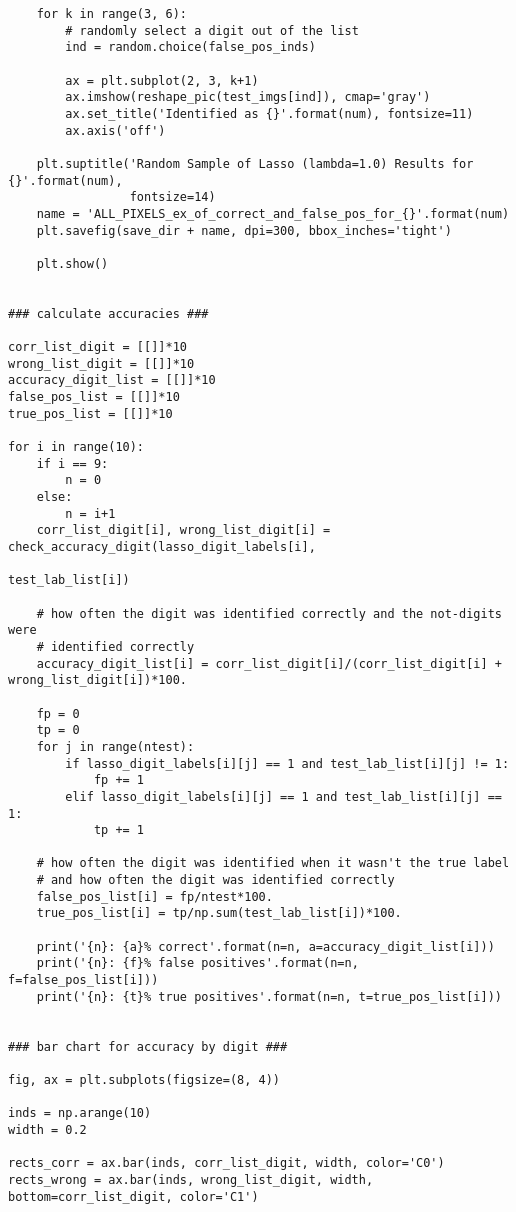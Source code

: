 \documentclass[10pt]{article}
\begin{document}
\begin{lstlisting}
    for k in range(3, 6):
        # randomly select a digit out of the list
        ind = random.choice(false_pos_inds)
        
        ax = plt.subplot(2, 3, k+1)
        ax.imshow(reshape_pic(test_imgs[ind]), cmap='gray')
        ax.set_title('Identified as {}'.format(num), fontsize=11)
        ax.axis('off')        
    
    plt.suptitle('Random Sample of Lasso (lambda=1.0) Results for {}'.format(num),
                 fontsize=14)
    name = 'ALL_PIXELS_ex_of_correct_and_false_pos_for_{}'.format(num)
    plt.savefig(save_dir + name, dpi=300, bbox_inches='tight')
    
    plt.show()


### calculate accuracies ###

corr_list_digit = [[]]*10
wrong_list_digit = [[]]*10
accuracy_digit_list = [[]]*10
false_pos_list = [[]]*10
true_pos_list = [[]]*10

for i in range(10):
    if i == 9:
        n = 0
    else:
        n = i+1
    corr_list_digit[i], wrong_list_digit[i] = check_accuracy_digit(lasso_digit_labels[i],
                                                                   test_lab_list[i])
    
    # how often the digit was identified correctly and the not-digits were
    # identified correctly
    accuracy_digit_list[i] = corr_list_digit[i]/(corr_list_digit[i] + wrong_list_digit[i])*100.
    
    fp = 0
    tp = 0
    for j in range(ntest):
        if lasso_digit_labels[i][j] == 1 and test_lab_list[i][j] != 1:
            fp += 1
        elif lasso_digit_labels[i][j] == 1 and test_lab_list[i][j] == 1:
            tp += 1
    
    # how often the digit was identified when it wasn't the true label
    # and how often the digit was identified correctly
    false_pos_list[i] = fp/ntest*100.
    true_pos_list[i] = tp/np.sum(test_lab_list[i])*100.
    
    print('{n}: {a}% correct'.format(n=n, a=accuracy_digit_list[i]))
    print('{n}: {f}% false positives'.format(n=n, f=false_pos_list[i]))
    print('{n}: {t}% true positives'.format(n=n, t=true_pos_list[i]))
    

### bar chart for accuracy by digit ###

fig, ax = plt.subplots(figsize=(8, 4))

inds = np.arange(10)
width = 0.2

rects_corr = ax.bar(inds, corr_list_digit, width, color='C0')
rects_wrong = ax.bar(inds, wrong_list_digit, width, bottom=corr_list_digit, color='C1')


\end{lstlisting}
\end{document}
